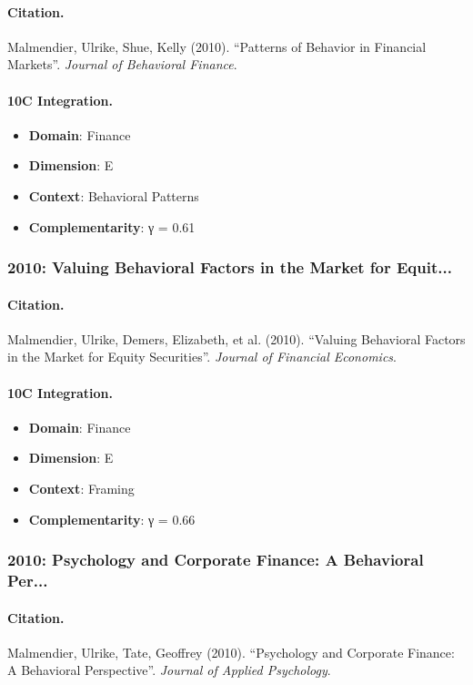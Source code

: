 \paragraph{Citation.}
Malmendier, Ulrike, Shue, Kelly (2010). ``Patterns of Behavior in Financial Markets''. \textit{Journal of Behavioral Finance}.

\paragraph{10C Integration.}
\begin{itemize}[nosep]
  \item \textbf{Domain}: Finance
  \item \textbf{Dimension}: E
  \item \textbf{Context}: Behavioral Patterns
  \item \textbf{Complementarity}: γ = 0.61
\end{itemize}


\subsubsection{2010: Valuing Behavioral Factors in the Market for Equit...}

\paragraph{Citation.}
Malmendier, Ulrike, Demers, Elizabeth, et al. (2010). ``Valuing Behavioral Factors in the Market for Equity Securities''. \textit{Journal of Financial Economics}.

\paragraph{10C Integration.}
\begin{itemize}[nosep]
  \item \textbf{Domain}: Finance
  \item \textbf{Dimension}: E
  \item \textbf{Context}: Framing
  \item \textbf{Complementarity}: γ = 0.66
\end{itemize}


\subsubsection{2010: Psychology and Corporate Finance: A Behavioral Per...}

\paragraph{Citation.}
Malmendier, Ulrike, Tate, Geoffrey (2010). ``Psychology and Corporate Finance: A Behavioral Perspective''. \textit{Journal of Applied Psychology}.

